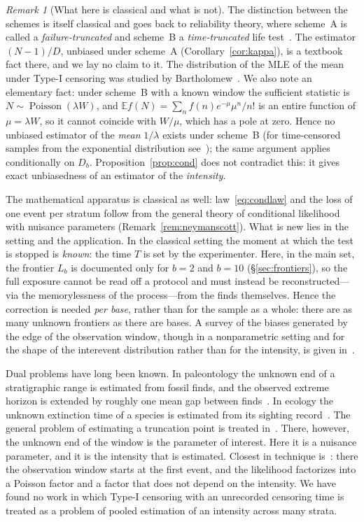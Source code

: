 \documentclass[11pt,a4paper]{article}
\theoremstyle{plain}
\theoremstyle{remark}
\newtheorem{remark}{Remark}
\DeclareMathOperator{\Pois}{Poisson}
\begin{document}
\begin{remark}[What here is classical and what is not]\label{rem:priority}
The distinction between the schemes is itself classical and goes back to
reliability theory, where scheme~A is called a \emph{failure-truncated} and
scheme~B a \emph{time-truncated} life test~\cite{epstein1954trunc,epsteinsobel1954}. The estimator $(N-1)/D$, unbiased under scheme~A
(Corollary~\ref{cor:kappa}), is a textbook fact there, and we lay no claim to
it. The distribution of the MLE of the mean under Type-I censoring was studied
by Bartholomew~\cite{bartholomew1963}. We also note an elementary fact: under
scheme~B with a known window the sufficient statistic is
$N\sim\Pois(\lambda W)$, and $\mathbb E f(N)=\sum_nf(n)e^{-\mu}\mu^n/n!$ is an
entire function of $\mu=\lambda W$, so it cannot coincide with $W/\mu$, which has
a pole at zero. Hence no unbiased estimator of the \emph{mean} $1/\lambda$ exists
under scheme~B (for time-censored samples from the exponential distribution
see~\cite{sengupta2009}); the same argument applies conditionally on $D_b$.
Proposition~\ref{prop:cond} does not contradict this: it gives exact
unbiasedness of an estimator of the \emph{intensity}.

The mathematical apparatus is classical as well: law~\eqref{eq:condlaw} and the
loss of one event per stratum follow from the general theory of conditional
likelihood with nuisance parameters (Remark~\ref{rem:neymanscott}). What is new
lies in the setting and the application. In the classical setting the moment at
which the test is stopped is \emph{known}: the time $T$ is set by the
experimenter. Here, in the main set, the frontier $L_b$ is documented only for
$b=2$ and $b=10$ (\S\ref{sec:frontiers}), so the full exposure cannot be read off a protocol and
must instead be reconstructed---via the memorylessness of the process---from the
finds themselves. Hence the correction is needed \emph{per base}, rather than for
the sample as a whole: there are as many unknown frontiers as there are
bases. A survey of the biases generated by the edge of the observation
window, though in a nonparametric setting and for the shape of the interevent
distribution rather than for the intensity, is given in~\cite{kivela2015}.

Dual problems have long been known. In paleontology the unknown end of a
stratigraphic range is estimated from fossil finds, and the observed extreme
horizon is extended by roughly one mean gap between
finds~\cite{straussSadler1989,marshall1990}. In ecology the unknown extinction
time of a species is estimated from its sighting record~\cite{solow1993}. The
general problem of estimating a truncation point is treated
in~\cite{robsonwhitlock1964}. There, however, the unknown end of the window is
the parameter of interest. Here it is a nuisance parameter, and it is the
intensity that is estimated. Closest in technique is~\cite{liu2023}: there the
observation window starts at the first event, and the likelihood factorizes into
a Poisson factor and a factor that does not depend on the intensity. We have
found no work in which Type-I censoring with an unrecorded censoring time is
treated as a problem of pooled estimation of an intensity across many strata.
\end{remark}
\end{document}
